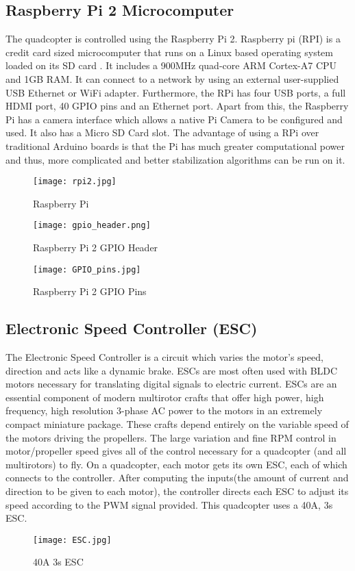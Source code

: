 \subsection{Raspberry Pi 2 Microcomputer}
The quadcopter is controlled using the Raspberry Pi 2. Raspberry pi (RPI) is a credit card sized microcomputer that runs on a Linux based operating system loaded on its SD card . It includes a 900MHz quad-core ARM Cortex-A7 CPU and 1GB RAM.
It can connect to a network by using an external user-supplied USB Ethernet or WiFi adapter. Furthermore, the RPi has four USB ports, a full HDMI port, 40 GPIO pins and an Ethernet port. Apart from this, the Raspberry Pi has a camera interface which allows a native Pi Camera to be configured and used. It also has a Micro SD Card slot. The advantage of using a RPi over traditional Arduino boards is that the Pi has much greater computational power and thus, more complicated and better stabilization algorithms can be run on it. 

\begin{figure}[H]
  \centering
  \texttt{[image: rpi2.jpg]}
  \caption{Raspberry Pi}
  \label{RPi}	
\end{figure}

\begin{figure}[H]
  \centering
  \texttt{[image: gpio\_header.png]}
  \caption{Raspberry Pi 2 GPIO Header}
  \label{RPi Pins} 
\end{figure}
\begin{figure}[H]
  \centering
  \texttt{[image: GPIO\_pins.jpg]}
  \caption{Raspberry Pi 2 GPIO Pins}
  \label{RPi Pins} 
\end{figure}


\subsection{Electronic Speed Controller (ESC)}
The Electronic Speed Controller is a circuit which varies the motor's speed, direction and acts like a dynamic brake. ESCs are most often used with BLDC motors necessary for translating digital signals to electric current. ESCs are an essential component of modern multirotor crafts that offer high power, high frequency, high resolution 3-phase AC power to the motors in an extremely compact miniature package. These crafts depend entirely on the variable speed of the motors driving the propellers. The large variation and fine RPM control in motor/propeller speed gives all of the control necessary for a quadcopter (and all multirotors) to fly. On a quadcopter, each motor gets its own ESC, each of which connects to the controller. After computing the inputs(the amount of current and direction to be given to each motor), the controller directs each ESC to adjust its speed according to the PWM signal provided.
This quadcopter uses a 40A, 3s ESC.
\begin{figure}[H]
  \centering
  \texttt{[image: ESC.jpg]}
  \caption{40A 3s ESC}
  \label{40A 3s ESC}	
\end{figure}



